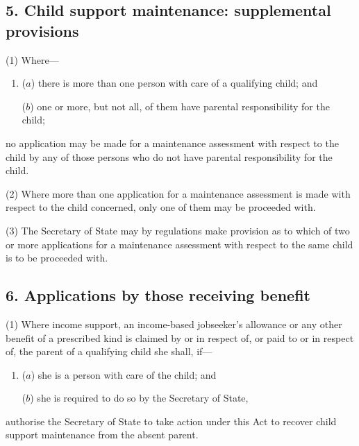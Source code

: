 \documentclass[12pt,a4paper]{article}
\begin{document}
\subsection{5. Child support maintenance: supplemental provisions}

(1) Where—
\begin{enumerate}\item[]
($a$) there is more than one person with care of a qualifying child; and

($b$) one or more, but not all, of them have parental responsibility for 
the child;
\end{enumerate}
no application may be made for a maintenance assessment with respect to the child by any of those persons who do not have parental responsibility for 
the child.

(2) Where more than one application for a maintenance assessment is made with respect to the child concerned, only one of them may be proceeded with.

(3) The Secretary of State may by regulations make provision as to which of two or more applications for a maintenance assessment with respect to the same child is to be proceeded with.


\subsection{6. Applications by those receiving benefit}

(1) Where income support, 
an income-based jobseeker’s allowance  %
or any other benefit of a prescribed kind is claimed by or in respect of, or paid to or in respect of, the parent of a qualifying child she shall, if—
\begin{enumerate}\item[]
($a$) she is a person with care of the child; and

($b$) she is required to do so by the Secretary of State,
\end{enumerate}
authorise the Secretary of State to take action under this Act to recover child support maintenance from the absent parent.
\end{document}
